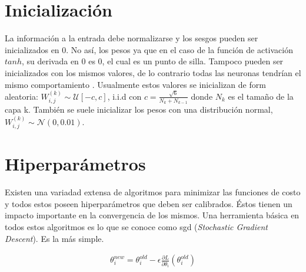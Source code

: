 \section{Inicialización}

\indent La información a la entrada debe normalizarse y los sesgos pueden ser inicializados en 0. No así, los pesos
ya que en el caso de la función de activación $tanh$, su derivada en 0 es 0, el cual es un punto de silla. Tampoco
pueden ser inicializados con los mismos valores, de lo contrario todas las neuronas tendrían el mismo comportamiento
. Usualmente estos valores se inicializan de form aleatoria: $W_{i,j}^{(k)} \sim \mathcal{U}[-c,c]$, i.i.d con
$c=\frac{\sqrt{6}}{N_k+N_{k-1}}$ donde $N_k$ es el tamaño de la capa k. También se suele inicializar los pesos con
una distribución normal, $W_{i,j}^{(k)} \sim \mathcal{N}(0,0.01)$.

\section{Hiperparámetros}

\indent Existen una variadad extensa de algoritmos para minimizar las funciones de costo y todos estos poseen
hiperparámetros que deben ser calibrados. Éstos tienen un impacto importante en la convergencia de los mismos. Una
herramienta básica en todos estos algoritmos es lo que se conoce como \acrshort{sgd} (\textit{Stochastic Gradient
Descent}). Es la más simple.

\begin{align}
  \theta_i^{new} = \theta_i^{old}-\epsilon \frac{\partial L}{\partial \theta_i}(\theta_i^{old})
\end{align}

